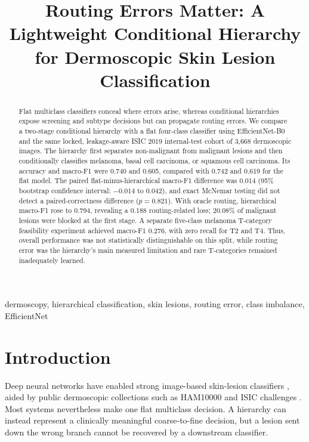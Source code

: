 \documentclass[a4paper,conference]{IEEEtran}
\title{Routing Errors Matter: A Lightweight Conditional Hierarchy for
Dermoscopic Skin Lesion Classification}
\author{\IEEEauthorblockN{Anonymous Authors}}
\begin{document}
\maketitle

\begin{abstract}
Flat multiclass classifiers conceal where errors arise, whereas conditional
hierarchies expose screening and subtype decisions but can propagate routing
errors. We compare a two-stage conditional hierarchy with a flat four-class
classifier using EfficientNet-B0 and the same locked, leakage-aware ISIC 2019
internal-test cohort of 3,668 dermoscopic images. The hierarchy first separates
non-malignant from malignant lesions and then conditionally classifies melanoma,
basal cell carcinoma, or squamous cell carcinoma. Its accuracy and macro-F1
were 0.740 and 0.605, compared with 0.742 and 0.619 for the flat model. The
paired flat-minus-hierarchical macro-F1 difference was 0.014 (95\% bootstrap
confidence interval: $-0.014$ to 0.042), and exact McNemar testing did not
detect a paired-correctness difference ($p=0.821$). With oracle routing,
hierarchical macro-F1 rose to 0.794, revealing a 0.188 routing-related loss;
20.08\% of malignant lesions were blocked at the first stage. A separate
five-class melanoma T-category feasibility experiment achieved macro-F1 0.276,
with zero recall for T2 and T4. Thus, overall performance was not statistically
distinguishable on this split, while routing error was the hierarchy's main
measured limitation and rare T-categories remained inadequately learned.
\end{abstract}

\begin{IEEEkeywords}
dermoscopy, hierarchical classification, skin lesions, routing error,
class imbalance, EfficientNet
\end{IEEEkeywords}

\section{Introduction}
Deep neural networks have enabled strong image-based skin-lesion classifiers
\cite{esteva2017,tschandl2020}, aided by public dermoscopic collections such as
HAM10000 \cite{tschandl2018} and ISIC challenges \cite{codella2019}. Most
systems nevertheless make one flat multiclass decision. A hierarchy can instead
represent a clinically meaningful coarse-to-fine decision, but a lesion sent
down the wrong branch cannot be recovered by a downstream classifier.
\end{document}
